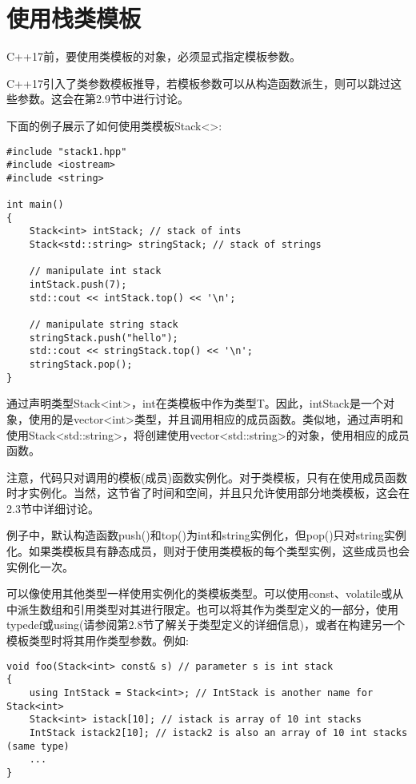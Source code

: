 \section{使用栈类模板}

C++17前，要使用类模板的对象，必须显式指定模板参数。

\begin{tcolorbox}[colback=webgreen!5!white,colframe=webgreen!75!black]
\hspace*{0.75cm}C++17引入了类参数模板推导，若模板参数可以从构造函数派生，则可以跳过这些参数。这会在第2.9节中进行讨论。
\end{tcolorbox}

下面的例子展示了如何使用类模板Stack<>:

\begin{lstlisting}[style=styleCXX]
#include "stack1.hpp"
#include <iostream>
#include <string>

int main()
{
	Stack<int> intStack; // stack of ints
	Stack<std::string> stringStack; // stack of strings
	
	// manipulate int stack
	intStack.push(7);
	std::cout << intStack.top() << '\n';
	
	// manipulate string stack
	stringStack.push("hello");
	std::cout << stringStack.top() << '\n';
	stringStack.pop();
}
\end{lstlisting}

通过声明类型Stack<int>，int在类模板中作为类型T。因此，intStack是一个对象，使用的是vector<int>类型，并且调用相应的成员函数。类似地，通过声明和使用Stack<std::string>，将创建使用vector<std::string>的对象，使用相应的成员函数。

注意，代码只对调用的模板(成员)函数实例化。对于类模板，只有在使用成员函数时才实例化。当然，这节省了时间和空间，并且只允许使用部分地类模板，这会在2.3节中详细讨论。

例子中，默认构造函数push()和top()为int和string实例化，但pop()只对string实例化。如果类模板具有静态成员，则对于使用类模板的每个类型实例，这些成员也会实例化一次。

可以像使用其他类型一样使用实例化的类模板类型。可以使用const、volatile或从中派生数组和引用类型对其进行限定。也可以将其作为类型定义的一部分，使用typedef或using(请参阅第2.8节了解关于类型定义的详细信息)，或者在构建另一个模板类型时将其用作类型参数。例如:

\begin{lstlisting}[style=styleCXX]
void foo(Stack<int> const& s) // parameter s is int stack
{
	using IntStack = Stack<int>; // IntStack is another name for Stack<int>
	Stack<int> istack[10]; // istack is array of 10 int stacks
	IntStack istack2[10]; // istack2 is also an array of 10 int stacks (same type)
	...
}
\end{lstlisting}

